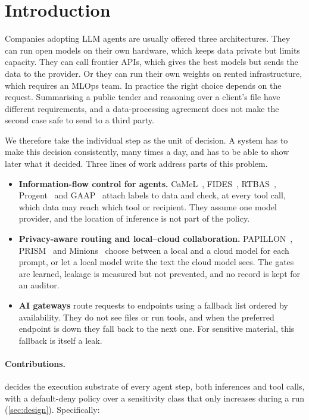 \section{Introduction}
\label{sec:intro}

Companies adopting LLM agents are usually offered three architectures. They can run open models
on their own hardware, which keeps data private but limits capacity. They can call frontier
APIs, which gives the best models but sends the data to the provider. Or they can run their own
weights on rented infrastructure, which requires an MLOps team. In practice the right choice
depends on the request. Summarising a public tender and reasoning over a client's file have
different requirements, and a data-processing agreement does not make the second case safe to
send to a third party.

We therefore take the individual step as the unit of decision. A system has to make this
decision consistently, many times a day, and has to be able to show later what it decided.
Three lines of work address parts of this problem.

\begin{itemize}
  \item \textbf{Information-flow control for agents.} CaMeL~\citep{debenedetti2025camel},
    FIDES~\citep{costa2025fides}, RTBAS~\citep{zhong2025rtbas}, Progent~\citep{shi2025progent}
    and GAAP~\citep{stanley2026gaap} attach labels to data and check, at every tool call, which
    data may reach which tool or recipient. They assume one model provider, and the location
    of inference is not part of the policy.
  \item \textbf{Privacy-aware routing and local--cloud collaboration.}
    PAPILLON~\citep{li2025papillon}, PRISM~\citep{zhan2026prism} and
    Minions~\citep{narayan2025minions} choose between a local and a cloud model for each
    prompt, or let a local model write the text the cloud model sees. The gates are learned,
    leakage is measured but not prevented, and no record is kept for an auditor.
  \item \textbf{AI gateways} route requests to endpoints using a fallback list ordered by
    availability. They do not see files or run tools, and when the preferred endpoint is down
    they fall back to the next one. For sensitive material, this fallback is itself a leak.
\end{itemize}

\paragraph{Contributions.} \annona{} decides the execution substrate of every agent step, both
inferences and tool calls, with a default-deny policy over a sensitivity class that only
increases during a run (\cref{sec:design}). Specifically:

